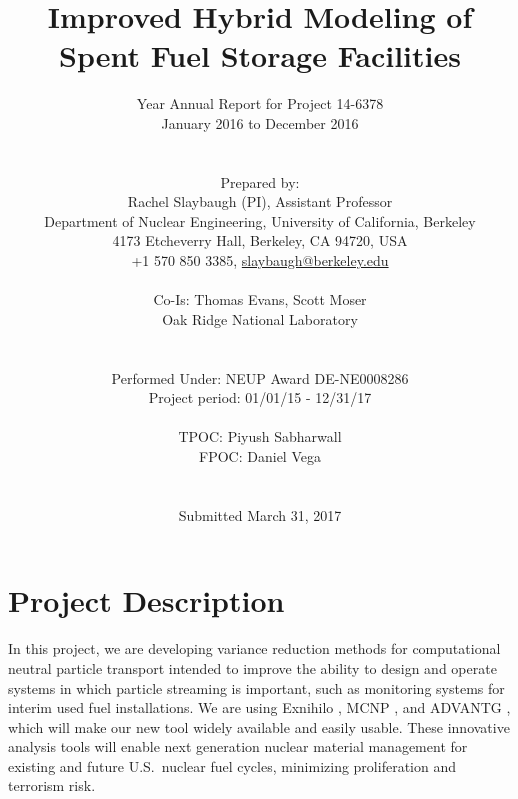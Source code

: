 \documentclass[12pt]{article}
\title{Improved Hybrid Modeling of Spent Fuel Storage Facilities}
\author{ 
  Year \yr Annual Report for Project 14-6378\\
  January 2016 to December 2016\\
  \\
  \\
  Prepared by:\\
  Rachel Slaybaugh (PI), Assistant Professor \\
  Department of Nuclear Engineering, University of California, Berkeley \\
  4173 Etcheverry Hall, Berkeley, CA 94720, USA\\
  +1 570 850 3385, 
  \href{mailto:slaybaugh@berkeley.edu}{slaybaugh@berkeley.edu}\\
  \\
 Co-Is: Thomas Evans, Scott Moser\\
  Oak Ridge National Laboratory\\
  \\
  \\
  Performed Under: NEUP Award DE-NE0008286\\
  Project period: 01/01/15 - 12/31/17 \\
  \\
  TPOC: Piyush Sabharwall\\
  FPOC: Daniel Vega\\
  \\
  \\
  Submitted March 31, 2017
}
\begin{document}


\maketitle
\clearpage
\tableofcontents
\clearpage
%

%

\section{Project Description}
\label{sect::project}

In this project, we are developing variance reduction methods for computational neutral particle transport intended to improve the ability to design and operate systems in which particle streaming is important, such as monitoring systems for interim used fuel installations. 
We are using Exnihilo \cite{evans_denovo:_2010}, MCNP \cite{brown_mcnp_2002}, and ADVANTG \cite{mosher_new_2010}, which will make our new tool widely available and easily usable. 
These innovative analysis tools will enable next generation nuclear material management for existing and future U.S.\ nuclear fuel cycles, minimizing proliferation and terrorism risk.
\end{document}
